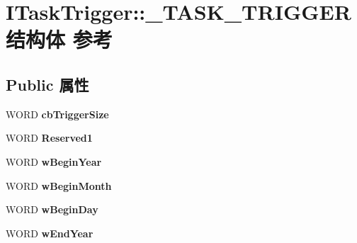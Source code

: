 \hypertarget{struct_i_task_trigger_1_1___t_a_s_k___t_r_i_g_g_e_r}{}\section{I\+Task\+Trigger\+:\+:\+\_\+\+T\+A\+S\+K\+\_\+\+T\+R\+I\+G\+G\+E\+R结构体 参考}
\label{struct_i_task_trigger_1_1___t_a_s_k___t_r_i_g_g_e_r}
\subsection*{Public 属性}
\begin{DoxyCompactItemize}
\item 
\mbox{\label{struct_i_task_trigger_1_1___t_a_s_k___t_r_i_g_g_e_r_aa8b437d1c378257c675af5ae32aa6da7}} 
W\+O\+RD {\bfseries cb\+Trigger\+Size}
\item 
\mbox{\label{struct_i_task_trigger_1_1___t_a_s_k___t_r_i_g_g_e_r_a4ceee93293223154b48eed0cff497390}} 
W\+O\+RD {\bfseries Reserved1}
\item 
\mbox{\label{struct_i_task_trigger_1_1___t_a_s_k___t_r_i_g_g_e_r_a12ee16a2d04cbf931ca1a35036691a30}} 
W\+O\+RD {\bfseries w\+Begin\+Year}
\item 
\mbox{\label{struct_i_task_trigger_1_1___t_a_s_k___t_r_i_g_g_e_r_ab57f16f64947ea7dff0bb244b21f4cce}} 
W\+O\+RD {\bfseries w\+Begin\+Month}
\item 
\mbox{\label{struct_i_task_trigger_1_1___t_a_s_k___t_r_i_g_g_e_r_af6f465ff66a7ef5788310963f3f522fc}} 
W\+O\+RD {\bfseries w\+Begin\+Day}
\item 
\mbox{\label{struct_i_task_trigger_1_1___t_a_s_k___t_r_i_g_g_e_r_a45f9f0d8428fafbd9d039f484011ce03}} 
W\+O\+RD {\bfseries w\+End\+Year}
\item 
\mbox{\label{struct_i_task_trigger_1_1___t_a_s_k___t_r_i_g_g_e_r_aad80829b5abfae9a4b0022b695b2d846}} 

\end{DoxyCompactItemize}
